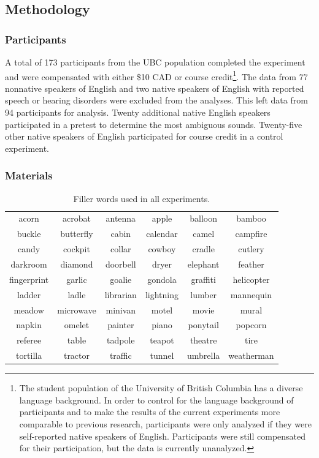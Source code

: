 \subsection{Methodology}

\subsubsection{Participants}

A total of 173 participants from the UBC population completed the experiment and were compensated with either \$10 CAD or course credit\footnote{The student population of the University of British Columbia has a diverse language background.  In order to control for the language background of participants and to make the results of the current experiments more comparable to previous research, participants were only analyzed if they were self-reported native speakers of English.  Participants were still compensated for their participation, but the data is currently unanalyzed.}.  
The data from 77 nonnative speakers of English and two native speakers of English with reported speech or hearing disorders were excluded from the analyses.
This left data from 94 participants for analysis.
Twenty additional native English speakers participated in a pretest to determine the most ambiguous sounds.  
Twenty-five other native speakers of English participated for course credit in a control experiment.

\subsubsection{Materials}

\begin{table}[ht]
\caption{Filler words used in all experiments.}
\label{tbl:fillerwords}
\centering
\begin{tabular}{cccccc}
\toprule
acorn       & acrobat   & antenna   & apple     & balloon  & bamboo     \\
buckle      & butterfly & cabin     & calendar  & camel    & campfire   \\
candy       & cockpit   & collar    & cowboy    & cradle   & cutlery    \\
darkroom    & diamond   & doorbell  & dryer     & elephant & feather    \\
fingerprint & garlic    & goalie    & gondola   & graffiti & helicopter \\
ladder      & ladle     & librarian & lightning & lumber   & mannequin  \\
meadow      & microwave & minivan   & motel     & movie    & mural      \\
napkin      & omelet    & painter   & piano     & ponytail & popcorn    \\
referee     & table     & tadpole   & teapot    & theatre  & tire       \\
tortilla    & tractor   & traffic   & tunnel    & umbrella & weatherman\\
\bottomrule
\end{tabular}
\end{table}

